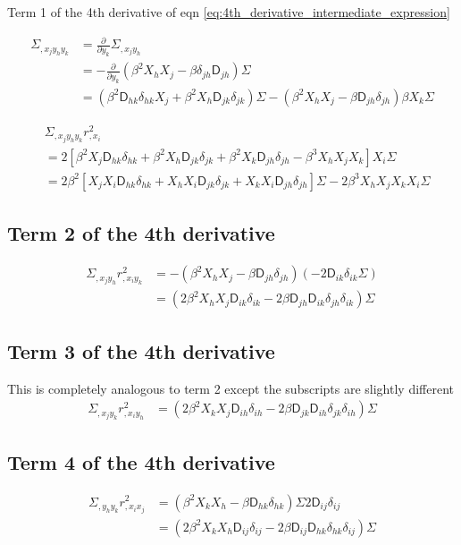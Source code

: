 Term 1 of the 4th derivative of eqn \ref{eq:4th_derivative_intermediate_expression}

\begin{align*}
\Sigma_{,x_j y_h y_k}
&= \frac{\partial}{\partial y_k} \Sigma_{,x_j y_h}\\ 
&= -\frac{\partial}{\partial y_k} (\beta^2 X_h X_j - \beta \delta_{jh} \mathsf{D}_{jh})\Sigma\\
&= (\beta^2 \mathsf{D}_{hk} \delta_{hk} X_j + \beta^2 X_h \mathsf{D}_{jk}\delta_{jk})\Sigma -
(\beta^2 X_h X_j - \beta \mathsf{D}_{jh} \delta_{jh})\beta X_k \Sigma
\end{align*}

\begin{align*}
&\Sigma_{,x_j y_h y_k} r_{,x_i}^2\\
&= 2[\beta^2 X_j \mathsf{D}_{hk} \delta_{hk} + \beta^2 X_h \mathsf{D}_{jk}\delta_{jk} +
\beta^2 X_k \mathsf{D}_{jh} \delta_{jh} - \beta^3 X_h X_j X_k] X_i \Sigma\\ 
&=\boxed{2\beta^2[ 
X_j X_i \mathsf{D}_{hk} \delta_{hk} + 
X_h X_i \mathsf{D}_{jk} \delta_{jk} + 
X_k X_i \mathsf{D}_{jh} \delta_{jh}] \Sigma 
- 2\beta^3 X_h X_j X_k X_i \Sigma} 
\end{align*}

\subsection{Term 2 of the 4th derivative}
\begin{align*}
\Sigma_{,x_j y_h} r^2_{,x_i y_k}
&= - (\beta^2 X_h X_j - \beta \mathsf{D}_{jh} \delta_{jh}) (-2\mathsf{D}_{ik}
\delta_{ik} \Sigma) \\  
&= \boxed{( 2 \beta^2  X_h X_j \mathsf{D}_{ik} \delta_{ik} 
-2 \beta \mathsf{D}_{jh} \mathsf{D}_{ik} \delta_{jh} \delta_{ik}) \Sigma} 
\end{align*}

\subsection{Term 3 of the 4th derivative}
This is completely analogous to term 2 except the subscripts are slightly
different
\begin{align*}
\Sigma_{,x_j y_k} r^2_{,x_i y_h}
&=\boxed { ( 2 \beta^2  X_k X_j \mathsf{D}_{ih} \delta_{ih} 
-2 \beta \mathsf{D}_{jk} \mathsf{D}_{ih} \delta_{jk} \delta_{ih}) \Sigma} 
\end{align*}

\subsection{Term 4 of the 4th derivative} 
\begin{align*}
\Sigma_{,y_h y_k} r^2_{,x_i x_j}
&= (\beta^2 X_k X_h - \beta \mathsf{D}_{hk}\delta_{hk})\Sigma 2 \mathsf{D}_{ij} \delta_{ij}\\ 
&= \boxed{(2\beta^2 X_k X_h \mathsf{D}_{ij} \delta_{ij} - 2\beta \mathsf{D}_{ij} \mathsf{D}_{hk} \delta_{hk}
\delta_{ij})\Sigma } 
\end{align*}

